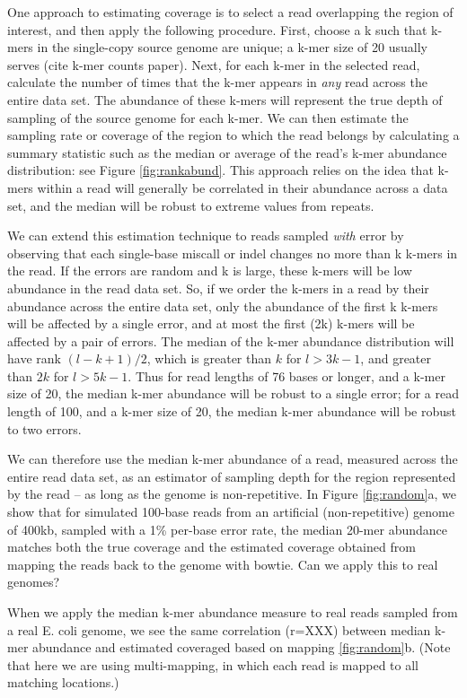 \documentclass[10pt]{article}
\begin{document}
One approach to estimating coverage is to select a read overlapping
the region of interest, and then apply the following procedure. First,
choose a k such that k-mers in the single-copy source genome are
unique; a k-mer size of 20 usually serves (cite k-mer counts paper).
Next, for each k-mer in the selected read, calculate the number of
times that the k-mer appears in {\em any} read across the entire data set.  The
abundance of these k-mers will represent the true depth of sampling of
the source genome for each k-mer.  We can then estimate the sampling
rate or coverage of the region to which the read belongs by calculating a
summary statistic such as the median or average of
the read's k-mer abundance distribution: see Figure
\ref{fig:rankabund}. This approach relies on the idea that
k-mers within a read will generally be correlated in their abundance
across a data set, and the median will be robust to extreme values
from repeats.

We can extend this estimation technique to reads sampled {\em with}
error by observing that each single-base miscall or indel changes no
more than k k-mers in the read.  If the errors are random and k is
large, these k-mers will be low abundance in the read data set.  So,
if we order the k-mers in a read by their abundance across the entire
data set, only the abundance of the first k k-mers will be affected by
a single error, and at most the first (2k) k-mers will be affected by
a pair of errors.  The median of the k-mer abundance distribution will
have rank $(l - k + 1) / 2$, which is greater than $k$ for $l > 3k-1$,
and greater than $2k$ for $l > 5k-1$.  Thus for read lengths of 76
bases or longer, and a k-mer size of 20, the median k-mer abundance
will be robust to a single error; for a read length of 100, and a
k-mer size of 20, the median k-mer abundance will be robust to two
errors.

We can therefore use the median k-mer abundance of a read, measured
across the entire read data set, as an estimator of sampling depth for
the region represented by the read -- as long as the genome is
non-repetitive.  In Figure \ref{fig:random}a, we show that for
simulated 100-base reads from an artificial (non-repetitive) genome of
400kb, sampled with a 1\% per-base error rate, the median 20-mer
abundance matches both the true coverage and the estimated coverage
obtained from mapping the reads back to the genome with bowtie.  Can
we apply this to real genomes?

When we apply the median k-mer abundance measure to real reads sampled
from a real E. coli genome, we see the same correlation (r=XXX)
between median k-mer abundance and estimated coveraged based on mapping
\ref{fig:random}b.
(Note that here we are using multi-mapping, in which each read is mapped
to all matching locations.)
\end{document}
